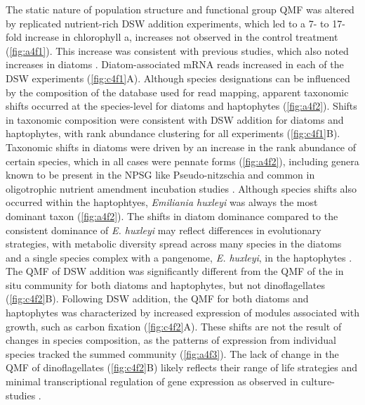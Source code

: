 The static nature of population structure and functional group QMF was altered by replicated nutrient-rich DSW addition experiments, which led to a 7- to 17-fold increase in chlorophyll a, increases not observed in the control treatment (\cref{fig:a4f1}). This increase was consistent with previous studies, which also noted increases in diatoms \citep{McAndrew2007}. Diatom-associated mRNA reads increased in each of the DSW experiments (\cref{fig:c4f1}A). Although species designations can be influenced by the composition of the database used for read mapping, apparent taxonomic shifts occurred at the species-level for diatoms and haptophytes (\cref{fig:a4f2}). Shifts in taxonomic composition were consistent with DSW addition for diatoms and haptophytes, with rank abundance clustering for all experiments (\cref{fig:c4f1}B).  Taxonomic shifts in diatoms were driven by an increase in the rank abundance of certain species, which in all cases were pennate forms (\cref{fig:a4f2}), including genera known to be present in the NPSG like Pseudo-nitzschia \citep{Silver2010} and common in oligotrophic nutrient amendment incubation studies \citep{Marchetti2005, Marchetti2012a}. Although species shifts also occurred within the haptophtyes, \textit{Emiliania huxleyi} was always the most dominant taxon (\cref{fig:a4f2}). The shifts in diatom dominance compared to the consistent dominance of \textit{E. huxleyi} may reflect differences in evolutionary strategies, with metabolic diversity spread across many species in the diatoms and a single species complex with a pangenome, \textit{E. huxleyi}, in the haptophytes \citep{Read2013}. The QMF of DSW addition was significantly different from the QMF of the in situ community for both diatoms and haptophytes, but not dinoflagellates (\cref{fig:c4f2}B). Following DSW addition, the QMF for both diatoms and haptophytes was characterized by increased expression of modules associated with growth, such as carbon fixation (\cref{fig:c4f2}A). These shifts are not the result of changes in species composition, as the patterns of expression from individual species tracked the summed community (\cref{fig:a4f3}). The lack of change in the QMF of dinoflagellates (\cref{fig:c4f2}B) likely reflects their range of life strategies \citep{Hackett2004} and minimal transcriptional regulation of gene expression as observed in culture-studies \citep{Moustafa2010}. \par


